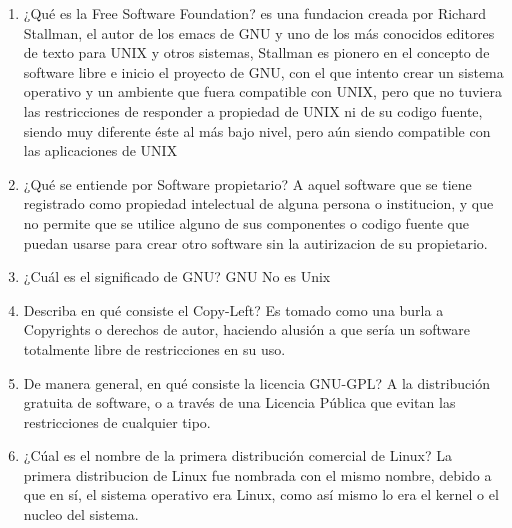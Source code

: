 \begin{enumerate}
			\item ¿Qué es la Free Software Foundation?
			es una fundacion creada por Richard Stallman, el autor de los emacs de GNU y uno de los más conocidos editores de texto para UNIX y otros sistemas, Stallman es pionero en el concepto de software libre e inicio el proyecto de GNU, con el que intento crear un sistema operativo  y un ambiente que fuera compatible con UNIX, pero que no tuviera las restricciones de responder a propiedad de UNIX ni de su codigo fuente, siendo muy diferente éste al más bajo nivel, pero aún siendo compatible con las aplicaciones de UNIX
			\item ¿Qué se entiende por Software propietario?
			A aquel software que se tiene registrado como propiedad intelectual de alguna persona o institucion, y que no permite que se utilice alguno de sus componentes o codigo fuente que puedan usarse para crear otro software sin la autirizacion de su propietario.
			\item ¿Cuál es el significado de GNU?
			GNU No es Unix
			\item Describa en qué consiste el Copy-Left?
			Es tomado como una burla a Copyrights o derechos de autor, haciendo alusión a que sería un software totalmente libre de restricciones en su uso.
			\item De manera general, en qué consiste la licencia GNU-GPL?
			A la distribución gratuita de software, o a través de una Licencia Pública que evitan las restricciones de cualquier tipo.
			\item ¿Cúal es el nombre de la primera distribución comercial de Linux?
			La primera distribucion de Linux fue nombrada con el mismo nombre, debido a que en sí, el sistema operativo era Linux, como así mismo lo era el kernel o el nucleo del sistema.
	\end{enumerate}

